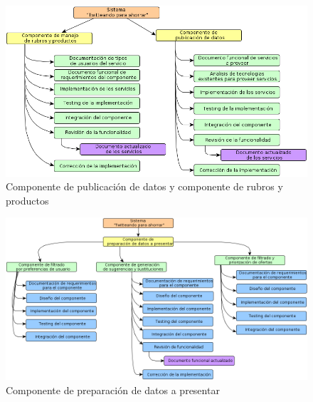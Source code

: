 \begin{figure}[H]
\centering
\includegraphics[scale=\escaladefault]{graficos/wbs/comp_rubros_y_api.png}
\caption{Componente de publicación de datos y componente de rubros y productos}
\end{figure}

\begin{figure}[H]
\centering
\includegraphics[scale=\escaladefault]{graficos/wbs/com_prep_de_datos.png}
\caption{Componente de preparación de datos a presentar}
\end{figure}

